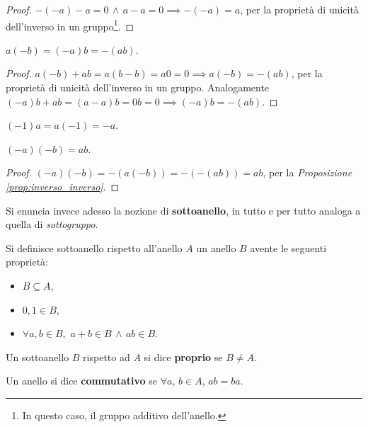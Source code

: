\documentclass[11pt]{scrbook}
\begin{document}
\begin{proof}
    $-(-a)-a=0 \,\land\, a-a=0 \implies -(-a)=a$, per la proprietà di unicità
    dell'inverso in un gruppo\footnote{In questo caso, il gruppo additivo dell'anello.}.
\end{proof}

\begin{proposition}
    \label{prop:inverso_inverso}
    $a(-b)=(-a)b=-(ab)$.
\end{proposition}

\begin{proof}
    $a(-b)+ab=a(b-b)=a0=0 \implies a(-b)=-(ab)$, per la proprietà di unicità dell'inverso in un gruppo. Analogamente $(-a)b+ab=(a-a)b=0b=0 \implies
        (-a)b=-(ab)$.
\end{proof}

\begin{corollary}
    $(-1)a=a(-1)=-a$.
\end{corollary}

\begin{proposition}
    $(-a)(-b)=ab$.
\end{proposition}

\begin{proof}
    $(-a)(-b)=-(a(-b))=-(-(ab))=ab$, per la \textit{Proposizione \ref{prop:inverso_inverso}}.
\end{proof}

Si enuncia invece adesso la nozione di \textbf{sottoanello}, in tutto e per
tutto analoga a quella di \textit{sottogruppo}.

\begin{definition}
    Si definisce sottoanello rispetto all'anello $A$ un anello $B$ avente le
    seguenti proprietà:

    \begin{itemize}
        \item $B \subseteq A$,
        \item $0, 1 \in B$,
        \item $\forall a, b \in B,$ $a + b \in B \,\land\, ab \in B$.
    \end{itemize}
\end{definition}

\begin{definition}
    Un sottoanello $B$ rispetto ad $A$ si dice \textbf{proprio} se
    $B \neq A$.
\end{definition}

\begin{definition}
    Un anello si dice \textbf{commutativo} se $\forall a$, $b \in A$, $ab=ba$.
\end{definition}
\end{document}

